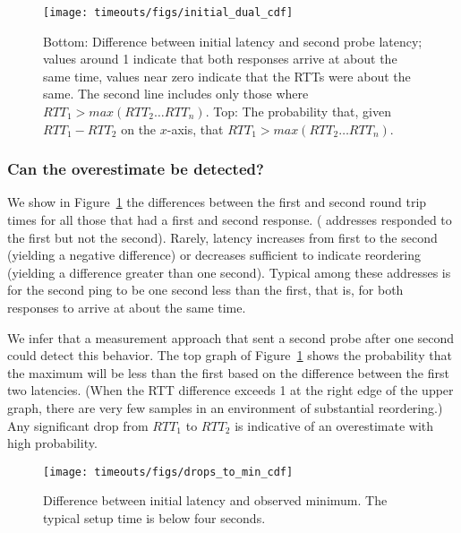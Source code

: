 \begin{figure}[tb]
\begin{center}
\texttt{[image: timeouts/figs/initial\_dual\_cdf]}
\end{center}
\caption{\label{fig:initial_drops_cdf}Bottom: Difference between initial latency and second probe latency; values around 1 indicate that both responses arrive at about the same time, values near zero indicate that the RTTs were about the same.  The second line includes only those where $RTT_1 > max(RTT_2 \ldots RTT_n)$.  Top: The probability that, given $RTT_1 - RTT_2$ on the $x$-axis, that $RTT_1 > max(RTT_2 \ldots RTT_n)$.}
\end{figure}


\subsubsection*{Can the overestimate be detected?}  We show in 
Figure~\ref{fig:initial_drops_cdf} the differences between the
first and second round trip times for all those that had a 
first and second response. (\countSecondProbeNoResponse{} 
addresses responded to the first but not the second).  Rarely,
latency increases from first to the second (yielding a negative 
difference) or decreases sufficient to indicate reordering (yielding 
a difference greater than one second).  Typical among these 
addresses is for the second ping to be one second less than the first, that
is, for both responses to arrive at about the same time.

We infer that a measurement approach that sent a second
probe after one second could detect this behavior.  The top
graph of Figure~\ref{fig:initial_drops_cdf} shows the
probability that the maximum will be less than the first based on the difference
between the first two latencies.  (When the RTT difference
exceeds 1 at the right edge of the upper graph, there are very
few samples in an environment of substantial reordering.)
Any significant drop from $RTT_1$ to $RTT_2$ is
indicative of an overestimate with high probability.

\begin{figure}[tb]
\begin{center}
\texttt{[image: timeouts/figs/drops\_to\_min\_cdf]}
\end{center}
\caption{\label{fig:drops_to_min}Difference between initial latency and observed minimum.  The typical setup time is below four seconds.}
\end{figure}

